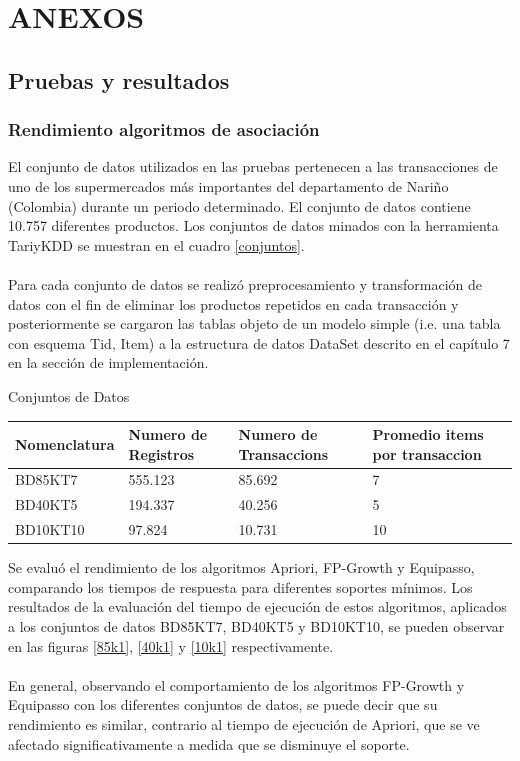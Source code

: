 \chapter{ANEXOS}
\section{Pruebas y resultados}
\subsection{Rendimiento algoritmos de asociaci\'on}

El conjunto de datos utilizados en las pruebas pertenecen a las transacciones de uno de los supermercados m\'as 
importantes del departamento de Nari\~no (Colombia) durante un periodo determinado. El conjunto de datos contiene 
10.757 diferentes productos. Los conjuntos de datos minados con la herramienta TariyKDD se muestran en el cuadro
\ref{conjuntos}.\\
\\
Para cada conjunto de datos se realiz\'o preprocesamiento y transformaci\'on de datos con el fin de eliminar los 
productos repetidos en cada transacci\'on y posteriormente se cargaron las tablas objeto de un modelo simple
(i.e. una tabla con esquema Tid, Item) a la estructura de datos DataSet descrito en el cap\'itulo 7 en la
secci\'on de implementaci\'on.\\

\begin{table}[h]
\caption{Conjuntos de Datos}
\label{conjuntos}
\end{table}
\begin{center}
\begin{tabular}{|p{30mm}|p{30mm}|p{30mm}|p{30mm}|}\hline
\textbf{Nomenclatura} & \textbf{Numero de Registros }& \textbf{Numero de Transaccions} & \textbf{Promedio items 
por transaccion} \\ \hline
BD85KT7 & 555.123 & 85.692 & 7 \\ \hline
BD40KT5 & 194.337 & 40.256 & 5 \\ \hline
BD10KT10 & 97.824 & 10.731 & 10 \\ \hline
\end{tabular}
\end{center}

Se evalu\'o el rendimiento de los algoritmos Apriori, FP-Growth y Equipasso, comparando los tiempos de respuesta 
para diferentes soportes m\'inimos. Los resultados de la evaluaci\'on del tiempo de ejecuci\'on de estos 
algoritmos, aplicados a los conjuntos de datos BD85KT7, BD40KT5 y BD10KT10, se pueden observar en las figuras
\ref{85k1}, \ref{40k1} y \ref{10k1} respectivamente.\\
\\
En general, observando el comportamiento de los algoritmos FP-Growth y Equipasso con los diferentes conjuntos de 
datos, se puede decir que su rendimiento es similar, contrario al tiempo de ejecuci\'on  de Apriori, que se ve 
afectado significativamente a medida que se disminuye el soporte.


